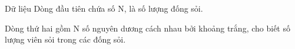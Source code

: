 Dữ liệu
Dòng đầu tiên chứa số N, là số lượng đống sỏi.  

   Dòng thứ hai gồm N số nguyên dương cách nhau bởi khoảng trắng, cho biết số lượng viên sỏi trong các đống sỏi.